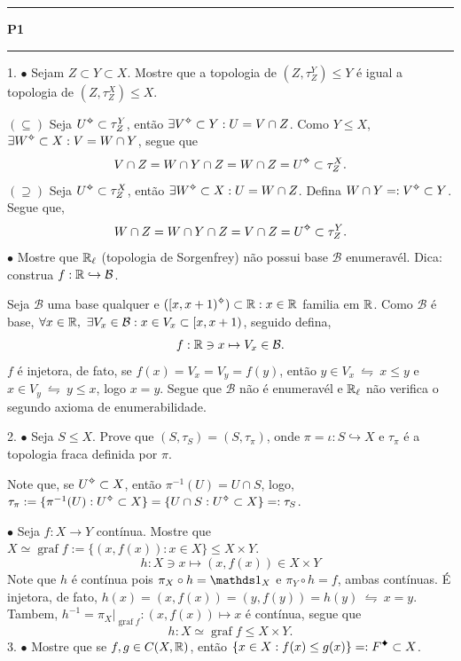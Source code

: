 \-\vspace{-0.7cm}
  {\hrule \vspace{-0.15cm}
  \centering \textbf{P1} \vspace{0.1cm}
  \hrule}

1. \(\bullet \) Sejam \(Z \subset Y \subset X\). Mostre que a topologia de \((Z,\tau_Z^Y)\leq Y\) é igual a topologia de \((Z,\tau_Z^X) \leq X\).  

\textcolor{gris}{\((\subseteq)\) Seja \(U\ab \subset \tau_Z^Y\), então \(\exists V\ab \subset Y : U = V\cap Z\). Como \(Y\leq X\), \(\exists W\ab\subset X : V = W \cap Y\), segue que 
\[V\cap Z = W \cap Y \cap Z = W \cap Z = U\ab \subset \tau_Z^X. \]
\((\supseteq )\) Seja \(U\ab \subset \tau_Z^X\), então \(\exists W\ab \subset X: U = W \cap Z\). Defina \(W\cap Y =: V\ab \subset Y \). Segue que,  
\[W \cap Z = W \cap Y \cap Z = V \cap Z = U\ab \subset \tau_Z^Y. \]
}
\(\bullet \) Mostre que \(\mathbb{R}_\ell\) (topologia de Sorgenfrey) não possui base \(\mathcal{B}\) enumeravél. Dica: construa \(f : \mathbb{R} \hookrightarrow \mathcal{B}\).  

\textcolor{gris}{Seja \(\mathcal{B}\) uma base qualquer e \(([x, x+1)\ab) \subset \R  : x \in \R\) familia  em \(\mathbb{R}\). Como \(\mathcal{B}\) é base, \( \forall x \in \mathbb{R},  \ \exists V_x \in \mathcal{B}  : x \in V_x \subset [x, x+1)\), seguido defina, 
\[f : \mathbb{R} \ni x \mapsto V_x \in \mathcal{B}. \]
\(f \) é injetora, de fato, se \(f(x) = V_x = V_y = f(y)\), então \(y \in V_x \ \leftrightharpoons \ x \leq y\) e \(x \in V_y \ \leftrightharpoons \ y \leq x\), logo \(x=y\). Segue que \(\mathcal{B}\) não é enumeravél e \(\mathbb{R}_\ell\) não verifica o segundo axioma de enumerabilidade.   
}

2. \(\bullet\) Seja \(S \leq X\). Prove que \((S, \tau_S) = (S, \tau_\pi)\), onde \(\pi = \iota : S \hookrightarrow X\) e \(\tau_\pi\) é a topologia fraca definida por \(\pi\).   

\textcolor{gris}{Note que, se \(U\ab \subset X\), então \(\pi^{-1}(U) = U\cap S\), logo, \(\tau_\pi := \{\pi^{-1}(U) : U\ab \subset X\} = \{U \cap S : U\ab \subset X\} =: \tau_S\).
}  

\(\bullet\) Seja \(f : X \to Y\) contínua. Mostre que \(X \simeq \operatorname{graf}f:= \{(x,f(x)) : x \in X\}\leq X \times Y\).   
\textcolor{gris}{\[h: X \ni x \mapsto (x,f(x)) \in X\times Y \] 
Note que \(h\) é contínua pois \(\pi_X \circ h = \id_X\) e \(\pi_{Y} \circ h = f\), ambas contínuas. É injetora, de fato, \(h(x) =  (x,f(x))= (y,f(y)) = h(y) \ \leftrightharpoons \ x= y \). Tambem, \(h^{-1} = \pi_X |_{\operatorname{graf}f}:  (x , f(x))\mapsto x\) é contínua, segue que
\[h: X \simeq \operatorname{graf}f \leq X\times Y. \]
}
3. \( \bullet\) Mostre que se \( f, g \in C(X,\mathbb{R})\), então \(\{x \in X : f(x) \leq g(x)\} =: F\ce \subset X\).   

